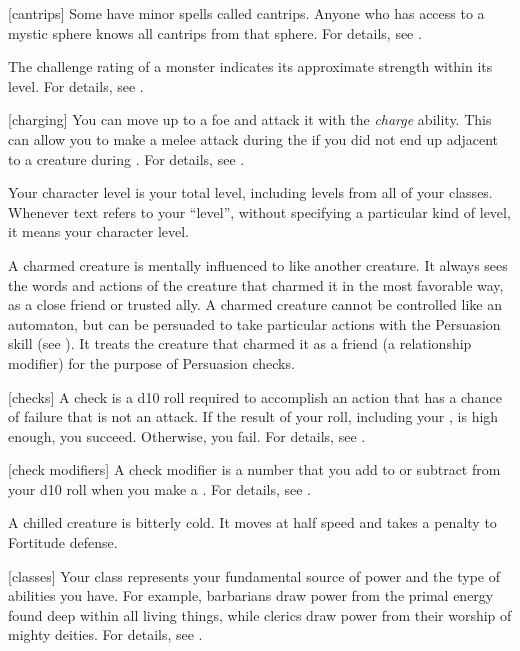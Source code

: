 [cantrips] Some  have minor spells called cantrips.
Anyone who has access to a mystic sphere knows all cantrips from that sphere.
For details, see .

 The challenge rating of a monster indicates its approximate strength within its level.
For details, see .

[charging] You can move up to a foe and attack it with the \textit{charge} ability.
This can allow you to make a melee attack during the  if you did not end up adjacent to a creature during .
For details, see .

 Your character level is your total level, including levels from all of your classes.
Whenever text refers to your ``level'', without specifying a particular kind of level, it means your character level.

 A charmed creature is mentally influenced to like another creature.
It always sees the words and actions of the creature that charmed it in the most favorable way, as a close friend or trusted ally.
A charmed creature cannot be controlled like an automaton, but can be persuaded to take particular actions with the Persuasion skill (see ).
It treats the creature that charmed it as a friend (a  relationship modifier) for the purpose of Persuasion checks.

[checks] A check is a d10 roll required to accomplish an action that has a chance of failure that is not an attack.
If the result of your roll, including your , is high enough, you succeed.
Otherwise, you fail.
For details, see .

[check modifiers] A check modifier is a number that you add to or subtract from your d10 roll when you make a .
For details, see .

 A chilled creature is bitterly cold.
It moves at half speed and takes a  penalty to Fortitude defense.

[classes] Your class represents your fundamental source of power and the type of abilities you have.
For example, barbarians draw power from the primal energy found deep within all living things, while clerics draw power from their worship of mighty deities.
For details, see .

